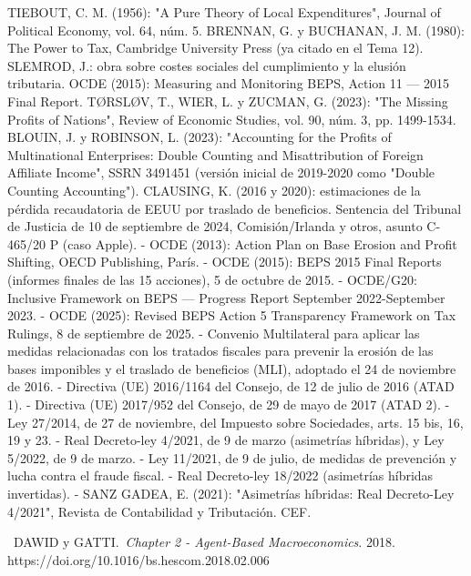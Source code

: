 \documentclass[10pt,a4paper]{article}
\newcounter{myref}
\newcommand{\MyBibItem}[4]{%
  \refstepcounter{myref}%
  \noindent[\themyref]\ #1.\ \emph{#2}. #3. #4\par
}
\begin{document}
TIEBOUT, C. M. (1956): "A Pure Theory of Local Expenditures", Journal of Political Economy, vol. 64, núm. 5.
BRENNAN, G. y BUCHANAN, J. M. (1980): The Power to Tax, Cambridge University Press (ya citado en el Tema 12).
SLEMROD, J.: obra sobre costes sociales del cumplimiento y la elusión tributaria.
OCDE (2015): Measuring and Monitoring BEPS, Action 11 — 2015 Final Report.
TØRSLØV, T., WIER, L. y ZUCMAN, G. (2023): "The Missing Profits of Nations", Review of Economic Studies, vol. 90, núm. 3, pp. 1499-1534.
BLOUIN, J. y ROBINSON, L. (2023): "Accounting for the Profits of Multinational Enterprises: Double Counting and Misattribution of Foreign Affiliate Income", SSRN 3491451 (versión inicial de 2019-2020 como "Double Counting Accounting").
CLAUSING, K. (2016 y 2020): estimaciones de la pérdida recaudatoria de EEUU por traslado de beneficios.
Sentencia del Tribunal de Justicia de 10 de septiembre de 2024, Comisión/Irlanda y otros, asunto C-465/20 P (caso Apple).
- OCDE (2013): Action Plan on Base Erosion and Profit Shifting, OECD Publishing, París.
- OCDE (2015): BEPS 2015 Final Reports (informes finales de las 15 acciones), 5 de octubre de 2015.
- OCDE/G20: Inclusive Framework on BEPS — Progress Report September 2022-September 2023.
- OCDE (2025): Revised BEPS Action 5 Transparency Framework on Tax Rulings, 8 de septiembre de 2025.
- Convenio Multilateral para aplicar las medidas relacionadas con los tratados fiscales para prevenir la erosión de las bases imponibles y el traslado de beneficios (MLI), adoptado el 24 de noviembre de 2016.
- Directiva (UE) 2016/1164 del Consejo, de 12 de julio de 2016 (ATAD 1).
- Directiva (UE) 2017/952 del Consejo, de 29 de mayo de 2017 (ATAD 2).
- Ley 27/2014, de 27 de noviembre, del Impuesto sobre Sociedades, arts. 15 bis, 16, 19 y 23.
- Real Decreto-ley 4/2021, de 9 de marzo (asimetrías híbridas), y Ley 5/2022, de 9 de marzo.
- Ley 11/2021, de 9 de julio, de medidas de prevención y lucha contra el fraude fiscal.
- Real Decreto-ley 18/2022 (asimetrías híbridas invertidas).
- SANZ GADEA, E. (2021): "Asimetrías híbridas: Real Decreto-Ley 4/2021", Revista de Contabilidad y Tributación. CEF.


\MyBibItem{DAWID y GATTI}{Chapter 2 - Agent-Based Macroeconomics}{2018}{https://doi.org/10.1016/bs.hescom.2018.02.006}


\clearpage
\end{document}
